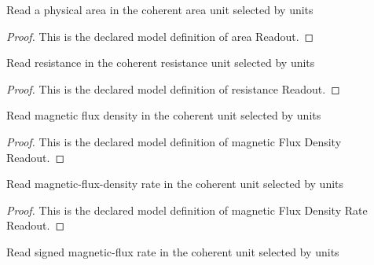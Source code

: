 \begin{definition}
  \label{def:physics:phyx-mini-0917:phyxminiproblems-problemphyxmini0917-areareadout}
  Read a physical area in the coherent area unit selected by units
\end{definition}
\begin{proof}
  This is the declared model definition of area Readout.
\end{proof}
\begin{definition}
  \label{def:physics:phyx-mini-0917:phyxminiproblems-problemphyxmini0917-resistancereadout}
  Read resistance in the coherent resistance unit selected by units
\end{definition}
\begin{proof}
  This is the declared model definition of resistance Readout.
\end{proof}
\begin{definition}
  \label{def:physics:phyx-mini-0917:phyxminiproblems-problemphyxmini0917-magneticfluxdensityreadout}
  Read magnetic flux density in the coherent unit selected by units
\end{definition}
\begin{proof}
  This is the declared model definition of magnetic Flux Density Readout.
\end{proof}
\begin{definition}
  \label{def:physics:phyx-mini-0917:phyxminiproblems-problemphyxmini0917-magneticfluxdensityratereadout}
  Read magnetic-flux-density rate in the coherent unit selected by units
\end{definition}
\begin{proof}
  This is the declared model definition of magnetic Flux Density Rate Readout.
\end{proof}
\begin{definition}
  \label{def:physics:phyx-mini-0917:phyxminiproblems-problemphyxmini0917-signedmagneticfluxratereadout}
  Read signed magnetic-flux rate in the coherent unit selected by units
\end{definition}
